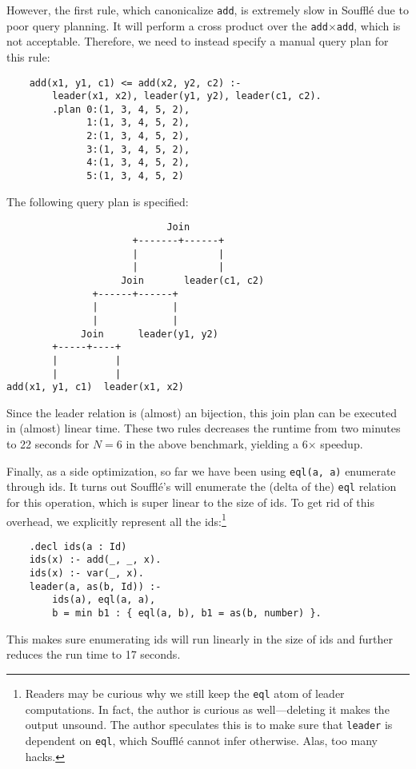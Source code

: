 However, the first rule, which canonicalize \verb|add|, 
 is extremely slow in Souffl\'e due to poor query planning.
It will perform a cross product over the \verb|add|$\times$\verb|add|,
 which is not acceptable.
Therefore, we need to instead specify a manual query plan for this rule:
\begin{verbatim}
    add(x1, y1, c1) <= add(x2, y2, c2) :-
        leader(x1, x2), leader(y1, y2), leader(c1, c2).
        .plan 0:(1, 3, 4, 5, 2), 
              1:(1, 3, 4, 5, 2), 
              2:(1, 3, 4, 5, 2), 
              3:(1, 3, 4, 5, 2), 
              4:(1, 3, 4, 5, 2), 
              5:(1, 3, 4, 5, 2)
\end{verbatim}
The following query plan is specified:
\begin{verbatim}
                            Join
                      +-------+------+
                      |              |
                      |              |
                    Join       leader(c1, c2)
               +------+------+
               |             |
               |             |
             Join      leader(y1, y2)
        +-----+----+
        |          |
        |          |
add(x1, y1, c1)  leader(x1, x2)
\end{verbatim}
Since the leader relation is (almost) an bijection,
 this join plan can be executed in (almost) linear time.
These two rules decreases the runtime from two minutes 
 to 22 seconds for $N=6$ in the above benchmark, 
 yielding a 6$\times$ speedup.

Finally, as a side optimization, 
 so far we have been using \verb|eql(a, a)| 
 enumerate through \eclass ids.
It turns out Souffl\'e's \eqrel{} will 
 enumerate the (delta of the) \verb|eql| relation
 for this operation, which is super linear to
 the size of \eclass ids.
To get rid of this overhead,
 we explicitly represent all the ids:\footnote{
     Readers may be curious why we still keep the \texttt{eql} atom
     of leader computations.
     In fact, the author is curious as well---deleting it
     makes the output unsound. 
     The author speculates this is to make sure that
     \texttt{leader} is dependent on \texttt{eql}, 
     which Souffl\'e cannot infer otherwise.
     Alas, too many hacks.}
\begin{verbatim}
    .decl ids(a : Id)
    ids(x) :- add(_, _, x).
    ids(x) :- var(_, x).
    leader(a, as(b, Id)) :- 
        ids(a), eql(a, a), 
        b = min b1 : { eql(a, b), b1 = as(b, number) }.
\end{verbatim}
This makes sure enumerating ids will run linearly in the size of \eclass
 ids and further reduces the run time to 17 seconds.

